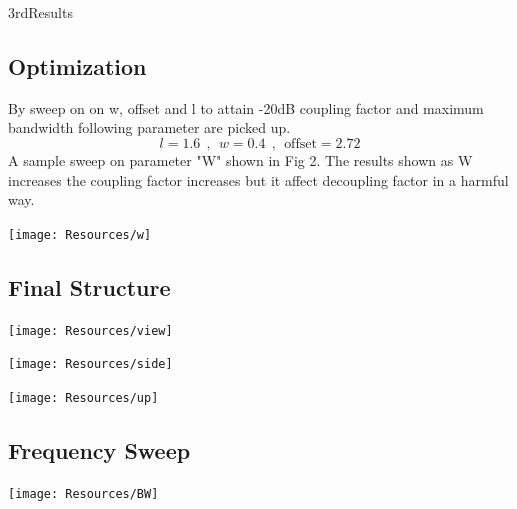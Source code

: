 \documentclass{article}
\begin{document}
\begin{homeworkProblem}{3rd}{Results}
\vspace{-1.5em}
\addtocounter{section}{1}
\setcounter{subsection}{0}
\subsection{‫‪Optimization}
By sweep on on w, offset and l to attain -20dB coupling factor and maximum bandwidth following parameter are picked up.\\
$$ l = 1.6 ~~ , ~~ w = 0.4 ~~ , ~~  \text{offset} = 2.72 $$
A sample sweep on parameter "W" shown in Fig 2. The results shown as W increases the coupling factor increases but it affect decoupling factor in a harmful way.\\
\begin{minipage}{\linewidth}
\texttt{[image: Resources/w]}
\centering
{}
~\\
\end{minipage}
\subsection{Final Structure}
\begin{minipage}{\linewidth}
\texttt{[image: Resources/view]}
\centering
{}
~\\
\end{minipage}
\begin{minipage}{\linewidth}
\texttt{[image: Resources/side]}
\centering
{}
~\\
\end{minipage}
\begin{minipage}{\linewidth}
\texttt{[image: Resources/up]}
\centering
{}
~\\
\end{minipage}
\subsection{Frequency Sweep}
\begin{minipage}{\linewidth}
\texttt{[image: Resources/BW]}
\centering
{}
~\\
\end{minipage}

\end{homeworkProblem}
\end{document}
